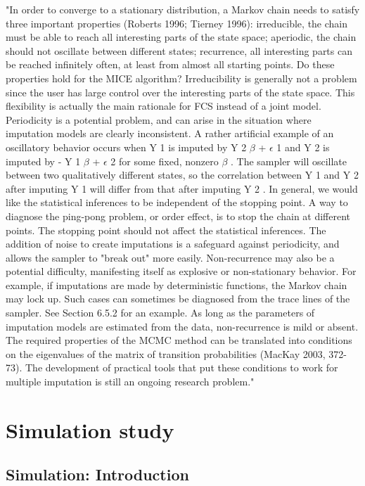 \documentclass[article]{jss}
\begin{document}
"In order to converge to a stationary distribution, a Markov chain needs to satisfy three important properties (Roberts 1996; Tierney 1996): irreducible, the chain must be able to reach all interesting parts of the state space; aperiodic, the chain should not oscillate between different states; recurrence, all interesting parts can be reached infinitely often, at least from almost all starting points. Do these properties hold for the MICE algorithm? Irreducibility is generally not a problem since the user has large control over the interesting parts of the state space. This flexibility is actually the main rationale for FCS instead of a joint model. Periodicity is a potential problem, and can arise in the situation where imputation models are clearly inconsistent. A rather artificial example of an oscillatory behavior occurs when Y 1 is imputed by Y 2 $\beta$ + $\epsilon$  1 and Y 2 is imputed by - Y 1 $\beta$ + $\epsilon$  2 for some fixed, nonzero $\beta$ . The sampler will oscillate between two qualitatively different states, so the correlation between Y 1 and Y 2 after imputing Y 1 will differ from that after imputing Y 2 . In general, we would like the statistical inferences to be independent of the stopping point. A way to diagnose the ping-pong problem, or order effect, is to stop the chain at different points. The stopping point should not affect the statistical inferences. The addition of noise to create imputations is a safeguard against periodicity, and allows the sampler to "break out" more easily. Non-recurrence may also be a potential difficulty, manifesting itself as explosive or non-stationary behavior. For example, if imputations are made by deterministic functions, the Markov chain may lock up. Such cases can sometimes be diagnosed from the trace lines of the sampler. See Section 6.5.2 for an example. As long as the parameters of imputation models are estimated from the data, non-recurrence is mild or absent. The required properties of the MCMC method can be translated into conditions on the eigenvalues of the matrix of transition probabilities (MacKay 2003, 372-73). The development of practical tools that put these conditions to work for multiple imputation is still an ongoing research problem." \cite[par.~4.5]{buur18}

\section{Simulation study}

\subsection{Simulation: Introduction}
\end{document}
